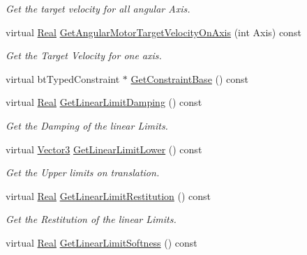 \begin{DoxyCompactItemize}
\begin{DoxyCompactList}\small\item\em Get the target velocity for all angular Axis. \item\end{DoxyCompactList}\item 
virtual \hyperlink{namespaceMezzanine_a726731b1a7df72bf3583e4a97282c6f6}{Real} \hyperlink{classMezzanine_1_1Generic6DofConstraint_afe97dfbe7c543987cdc287a0f69b73ea}{GetAngularMotorTargetVelocityOnAxis} (int Axis) const 
\begin{DoxyCompactList}\small\item\em Get the Target Velocity for one axis. \item\end{DoxyCompactList}\item 
virtual btTypedConstraint $\ast$ \hyperlink{classMezzanine_1_1Generic6DofConstraint_a37d4cbaf346ce8c11dada3fca32d0b42}{GetConstraintBase} () const 
\item 
virtual \hyperlink{namespaceMezzanine_a726731b1a7df72bf3583e4a97282c6f6}{Real} \hyperlink{classMezzanine_1_1Generic6DofConstraint_a3c6ee33f660eec42c2ae9cc6b22e5e2f}{GetLinearLimitDamping} () const 
\begin{DoxyCompactList}\small\item\em Get the Damping of the linear Limits. \item\end{DoxyCompactList}\item 
virtual \hyperlink{classMezzanine_1_1Vector3}{Vector3} \hyperlink{classMezzanine_1_1Generic6DofConstraint_a719503e5669f19e8e463b2621ec74bd8}{GetLinearLimitLower} () const 
\begin{DoxyCompactList}\small\item\em Get the Upper limits on translation. \item\end{DoxyCompactList}\item 
virtual \hyperlink{namespaceMezzanine_a726731b1a7df72bf3583e4a97282c6f6}{Real} \hyperlink{classMezzanine_1_1Generic6DofConstraint_ac969ae88077e58e035b7dfb6a44cc3f9}{GetLinearLimitRestitution} () const 
\begin{DoxyCompactList}\small\item\em Get the Restitution of the linear Limits. \item\end{DoxyCompactList}\item 
virtual \hyperlink{namespaceMezzanine_a726731b1a7df72bf3583e4a97282c6f6}{Real} \hyperlink{classMezzanine_1_1Generic6DofConstraint_a26c1a462de1abd0593d50b0da357ed62}{GetLinearLimitSoftness} () const 

\end{DoxyCompactItemize}
